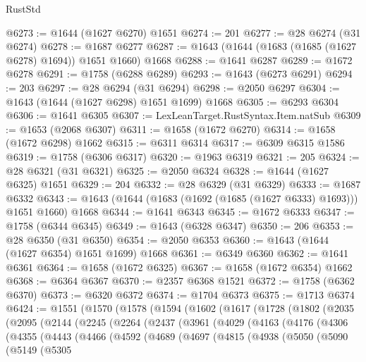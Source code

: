 \begin{lexlean}{RustStd}
\begin{coremodule}
@6273 := @1644 (@1627 @6270) @1651
@6274 := 201
@6277 := @28 @6274 (@31 @6274)
@6278 := @1687 @6277
@6287 := @1643 (@1644 (@1683 (@1685 (@1627 @6278) @1694)) @1651 @1660) @1668
@6288 := @1641 @6287
@6289 := @1672 @6278
@6291 := @1758 (@6288 @6289)
@6293 := @1643 (@6273 @6291)
@6294 := 203
@6297 := @28 @6294 (@31 @6294)
@6298 := @2050 @6297
@6304 := @1643 (@1644 (@1627 @6298) @1651 @1699) @1668
@6305 := @6293 @6304
@6306 := @1641 @6305
@6307 := LexLeanTarget.RustSyntax.Item.natSub
@6309 := @1653 (@2068 @6307)
@6311 := @1658 (@1672 @6270)
@6314 := @1658 (@1672 @6298) @1662
@6315 := @6311 @6314
@6317 := @6309 @6315 @1586
@6319 := @1758 (@6306 @6317)
@6320 := @1963 @6319
@6321 := 205
@6324 := @28 @6321 (@31 @6321)
@6325 := @2050 @6324
@6328 := @1644 (@1627 @6325) @1651
@6329 := 204
@6332 := @28 @6329 (@31 @6329)
@6333 := @1687 @6332
@6343 := @1643 (@1644 (@1683 (@1692 (@1685 (@1627 @6333) @1693))) @1651 @1660) @1668
@6344 := @1641 @6343
@6345 := @1672 @6333
@6347 := @1758 (@6344 @6345)
@6349 := @1643 (@6328 @6347)
@6350 := 206
@6353 := @28 @6350 (@31 @6350)
@6354 := @2050 @6353
@6360 := @1643 (@1644 (@1627 @6354) @1651 @1699) @1668
@6361 := @6349 @6360
@6362 := @1641 @6361
@6364 := @1658 (@1672 @6325)
@6367 := @1658 (@1672 @6354) @1662
@6368 := @6364 @6367
@6370 := @2357 @6368 @1521
@6372 := @1758 (@6362 @6370)
@6373 := @6320 @6372
@6374 := @1704 @6373
@6375 := @1713 @6374
@6424 := @1551
    (@1570
      (@1578
        (@1594
          (@1602
            (@1617
              (@1728
                (@1802
                  (@2035
                    (@2095
                      (@2144
                        (@2245
                          (@2264
                            (@2437
                              (@3961
                                (@4029
                                  (@4163
                                    (@4176
                                      (@4306
                                        (@4355
                                          (@4443
                                            (@4466
                                              (@4592
                                                (@4689
                                                  (@4697
                                                    (@4815
                                                      (@4938
                                                        (@5050
                                                          (@5090
                                                            (@5149
                                                              (@5305

\end{coremodule}
\end{lexlean}

